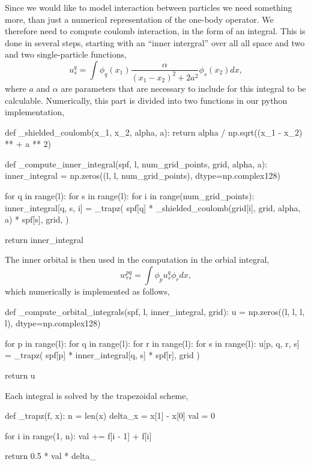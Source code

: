 Since we would like to model interaction between particles we need something more,
than just a numerical representation of the one-body operator. We therefore need to 
compute coulomb interaction, in the form of an integral. This is done in
several steps, starting with an ``inner intergral'' over all all space 
and two and two single-particle functions,
\begin{equation}
   u^q_s = \int \phi_q(x_1) \frac{\alpha}{(x_1-x_2)^2 + 2a^2}  \phi_s(x_2) dx,
\end{equation}
where $a$ and $\alpha$ are parameters that are necessary to include for this integral 
to be calculable.
Numerically, this part is divided into two functions in our python implementation,
\begin{python}
def _shielded_coulomb(x_1, x_2, alpha, a):
    return alpha / np.sqrt((x_1 - x_2) ** + a ** 2)

def _compute_inner_integral(spf, l, num_grid_points, grid, alpha, a):
    inner_integral = np.zeros((l, l, num_grid_points), dtype=np.complex128)

    for q in range(l):
        for s in range(l):
            for i in range(num_grid_points):
                inner_integral[q, s, i] = _trapz(
                    spf[q]
                    * _shielded_coulomb(grid[i], grid, alpha, a)
                    * spf[s],
                    grid,
                )

    return inner_integral
\end{python}
The inner orbital is then used in the computation in the orbial integral,
\begin{equation}
    w^{pq}_{rs} = \int \phi_p u^q_s \phi_r dx,
\end{equation}
which numerically is implemented as follows,
\begin{python}
def _compute_orbital_integrals(spf, l, inner_integral, grid):
    u = np.zeros((l, l, l, l), dtype=np.complex128)

    for p in range(l):
        for q in range(l):
            for r in range(l):
                for s in range(l):
                    u[p, q, r, s] = _trapz(
                        spf[p] * inner_integral[q, s] * spf[r], grid
                    )

    return u
\end{python}

Each integral is solved by the trapezoidal scheme,
\begin{python}
def _trapz(f, x):
   n = len(x)
   delta_x = x[1] - x[0]
   val = 0

   for i in range(1, n):
       val += f[i - 1] + f[i]

   return 0.5 * val * delta_
  
\end{python}

